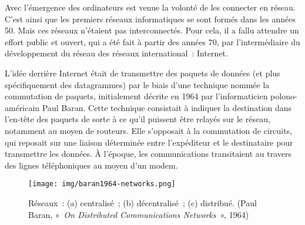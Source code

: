 
Avec l'émergence des ordinateurs est venue la volonté de les connecter en réseau. C'est ainsi que les premiers réseaux informatiques se sont formés dans les années 50. Mais ces réseaux n'étaient pas interconnectés. Pour cela, il a fallu attendre un effort public et ouvert, qui a été fait à partir des années 70, par l'intermédiaire du développement du réseau des réseaux international~: Internet.


L'idée derrière Internet était de transmettre des paquets de données (et plus spécifiquement des datagrammes) par le biais d'une technique nommée la commutation de paquets, initialement décrite en 1964 par l'informaticien polono-américain Paul Baran. Cette technique consistait à indiquer la destination dans l'en-tête des paquets de sorte à ce qu'il puissent être relayés sur le réseau, notamment au moyen de routeurs. Elle s'opposait à la commutation de circuits, qui reposait sur une liaison déterminée entre l'expéditeur et le destinataire pour transmettre les données. À l'époque, les communications transitaient au travers des lignes téléphoniques au moyen d'un modem.


\begin{figure}[h]
  \centering
  \texttt{[image: img/baran1964-networks.png]}
  \caption{Réseaux~: (a) centralisé~; (b) décentralisé~; (c) distribué. (Paul Baran, «~\emph{On Distributed Communications Networks}~», 1964)}
  \label{fig:baran1964-networks}
\end{figure}

